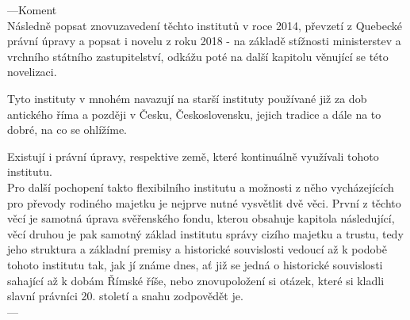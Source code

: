 \documentclass{article}
\begin{document}

---Koment\\
 Následně popsat znovuzavedení těchto institutů v roce 2014, převzetí z Quebecké právní úpravy a popsat i novelu z roku 2018 - na základě stížnosti ministerstev a vrchního státního zastupitelství, odkážu poté na další kapitolu věnující se této novelizaci.
 
 Tyto instituty v mnohém navazují na starší instituty používané již za dob antického říma a později v Česku, Československu, jejich tradice a dále na to dobré, na co se ohlížíme.
 
 Existují i právní úpravy, respektive země, které kontinuálně využívali tohoto institutu.\\
 
 Pro další pochopení takto flexibilního institutu a možnosti z něho vycházejících pro převody rodiného majetku je nejprve nutné vysvětlit dvě věci. První z těchto věcí je samotná úprava svěřenského fondu, kterou obsahuje kapitola následující, věcí druhou je pak samotný základ institutu správy cizího majetku a trustu, tedy jeho struktura a základní premisy a historické souvislosti vedoucí až k podobě tohoto institutu tak, jak jí známe dnes, ať již se jedná o historické souvislosti sahající až k dobám Římské říše, nebo znovupoložení si otázek, které si kladli slavní právníci 20. století a snahu zodpovědět je.\\
 ---\\


\end{document}
